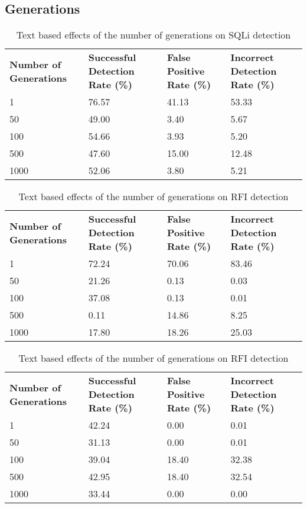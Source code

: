 \begin{appendices}
\newpage
\section{Generations}

\begin{table}[hp]
	\centering
	\begin{tabular}{|p{1.5in}|p{1in}|p{1in}|p{1in}|}
	\hline
	\textbf{Number of Generations} & \textbf{Successful Detection Rate (\%)} & \textbf{False Positive Rate (\%)} & \textbf{Incorrect Detection Rate (\%)}  \\
	\hhline{|=|=|=|=|}
	1 & 76.57 & 41.13 & 53.33 \\
	\hline
	50 & 49.00 & 3.40 & 5.67 \\
	\hline
	100 & 54.66 & 3.93 & 5.20 \\
	\hline
	500 & 47.60 & 15.00 & 12.48 \\
	\hline
	1000 & 52.06 & 3.80 & 5.21 \\
	\hline
	\end{tabular}
	\caption[]{Text based effects of the number of generations on SQLi detection}
	\label{app:sqlGenerationText}
\end{table}

\begin{table}[h]
	\centering
	\begin{tabular}{|p{1.5in}|p{1in}|p{1in}|p{1in}|}
	\hline
	\textbf{Number of Generations} & \textbf{Successful Detection Rate (\%)} & \textbf{False Positive Rate (\%)} & \textbf{Incorrect Detection Rate (\%)}  \\
	\hhline{|=|=|=|=|}
	1 & 72.24 & 70.06 & 83.46 \\
	\hline
	50 & 21.26 & 0.13 & 0.03 \\
	\hline
	100 & 37.08 & 0.13 & 0.01 \\
	\hline
	500 & 0.11 & 14.86 & 8.25 \\
	\hline
	1000 & 17.80 & 18.26 & 25.03 \\
	\hline
	\end{tabular}
	\caption[]{Text based effects of the number of generations on RFI detection}
	\label{app:xssGenerationText}
\end{table}

\begin{table}[h]
	\centering
	\begin{tabular}{|p{1.5in}|p{1in}|p{1in}|p{1in}|}
	\hline
	\textbf{Number of Generations} & \textbf{Successful Detection Rate (\%)} & \textbf{False Positive Rate (\%)} & \textbf{Incorrect Detection Rate (\%)}  \\
	\hhline{|=|=|=|=|}
	1 & 42.24 & 0.00 & 0.01 \\
	\hline
	50 & 31.13 & 0.00 & 0.01 \\
	\hline
	100 & 39.04 & 18.40 & 32.38 \\
	\hline
	500 & 42.95 & 18.40 & 32.54 \\
	\hline
	1000 & 33.44 & 0.00 & 0.00 \\
	\hline
	\end{tabular}
	\caption[]{Text based effects of the number of generations on RFI detection}
	\label{app:rfiGenerationText}
\end{table}


\end{appendices}
